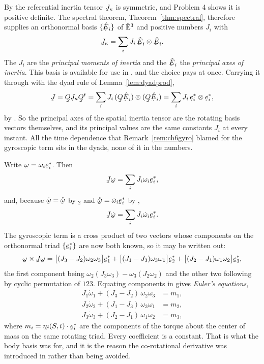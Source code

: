 By  the referential inertia tensor $\vek{J}_{\kappa}$ is
symmetric, and Problem 4 shows it is positive definite. The spectral
theorem, Theorem~\ref{thm:spectral}, therefore supplies an orthonormal
basis $\{\hbE_{i}\}$ of $\hat{\mathbb{E}}^{3}$ and positive numbers $J_{i}$ with
\[
   \vek{J}_{\kappa}=\sum_{i}J_{i}\,\hbE_{i}\otimes\hbE_{i} .
\]
The $J_{i}$ are the \emph{principal moments of inertia} and the
$\hbE_{i}$ the \emph{principal axes of inertia}. This basis is available
for use in , and the choice pays at once. Carrying it through
 with the dyad rule of Lemma~\ref{lem:dyadprod},
\[
   \vek{J}=\bQ\vek{J}_{\kappa}\bQ^{t}
   =\sum_{i}J_{i}\,(\bQ\hbE_{i})\otimes(\bQ\hbE_{i})
   =\sum_{i}J_{i}\,\be^{*}_{i}\otimes\be^{*}_{i} ,
\]
by . So the principal axes of the spatial inertia tensor are
the rotating basis vectors themselves, and its principal values are the
same constants $J_{i}$ at every instant. All the time dependence that
Remark~\ref{rem:ch6gyro} blamed for the gyroscopic term sits in the
dyads, none of it in the numbers.

Write $\bom=\omega_{i}\be^{*}_{i}$. Then
\[
   \vek{J}\bom=\sum_{i}J_{i}\omega_{i}\be^{*}_{i} ,
\]
and, because $\dot\bom=\mathring{\bom}$ by $_{2}$ and
$\mathring{\bom}=\dot\omega_{i}\be^{*}_{i}$ by ,
\[
   \vek{J}\dot\bom=\sum_{i}J_{i}\dot\omega_{i}\be^{*}_{i} .
\]
The gyroscopic term is a cross product of two vectors whose components
on the orthonormal triad $\{\be^{*}_{i}\}$ are now both known, so it may
be written out:
\[
   \bom\times\vek{J}\bom=
   \big[(J_{3}-J_{2})\omega_{2}\omega_{3}\big]\be^{*}_{1}
  +\big[(J_{1}-J_{3})\omega_{3}\omega_{1}\big]\be^{*}_{2}
  +\big[(J_{2}-J_{1})\omega_{1}\omega_{2}\big]\be^{*}_{3} ,
\]
the first component being $\omega_{2}(J_{3}\omega_{3})
-\omega_{3}(J_{2}\omega_{2})$ and the other two following by cyclic
permutation of $123$. Equating components in  gives
\emph{Euler's equations},
\[
\begin{aligned}
   J_{1}\dot\omega_{1}+(J_{3}-J_{2})\,\omega_{2}\omega_{3}&=m_{1},\\
   J_{2}\dot\omega_{2}+(J_{1}-J_{3})\,\omega_{3}\omega_{1}&=m_{2},\\
   J_{3}\dot\omega_{3}+(J_{2}-J_{1})\,\omega_{1}\omega_{2}&=m_{3},
\end{aligned}
\]
where $m_{i}=\ip{\bm(S,t)}{\be^{*}_{i}}$ are the components of the
torque about the center of mass on the same rotating triad. Every
coefficient is a constant. That is what the body basis was for, and it
is the reason the co-rotational derivative was introduced in 
rather than being avoided.

